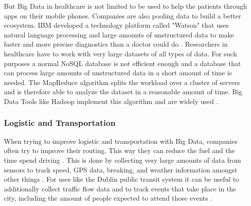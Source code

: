 \documentclass[runningheads]{llncs}
\begin{document}
But Big Data in healthcare is not limited to be used to help the patients through apps on their mobile phones. Companies are also pooling data to build a better ecosystem. IBM developed a technology platform called "Watson" that uses natural language processing and large amounts of unstructured data to make faster and more precise diagnostics than a doctor could do \cite{WATSON}.
Researchers in healthcare have to work with very large datasets of all types of data. 
For such purposes a normal NoSQL database is not efficient enough and a database that can process large amounts of unstructured data in a short amount of time is needed. The MapReduce algorithm  splits the workload over a cluster of servers and is therefore able to analyze the dataset in a reasonable amount of time. Big Data Tools like Hadoop implement this algorithm and are widely used \cite{GLOSSARY}.


\subsubsection{Logistic and Transportation} 
When trying to improve logistic and transportation with Big Data, companies often try to improve their routing. This way they can reduce the fuel and the time spend driving \cite{DAVENPORT}. This is done by collecting very large amounts of data from sensors to track speed, GPS data, breaking, and weather information amongst other things \cite{DAVENPORT}. For uses like the Dublin public transit system it can be useful to additionally collect traffic flow data and to track events that take place in the city, including the amount of people expected to attend those events \cite{TRANSPORT}.
\end{document}
